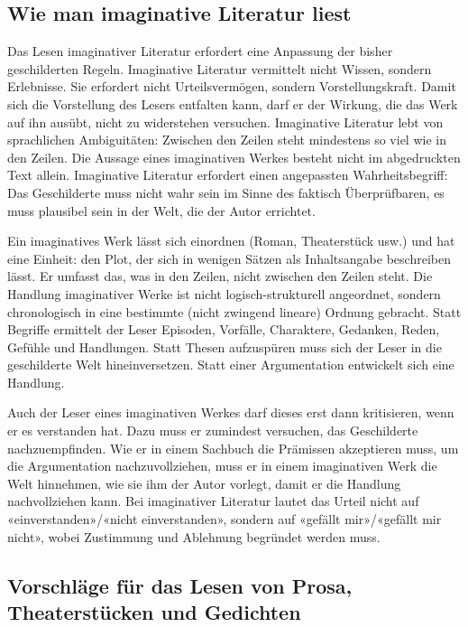 \documentclass[a4paper,11pt]{scrartcl}
\begin{document}
\subsection{Wie man imaginative Literatur liest}

Das Lesen imaginativer Literatur erfordert eine Anpassung der bisher geschilderten Regeln. Imaginative Literatur vermittelt nicht Wissen, sondern Erlebnisse. Sie erfordert nicht Urteilsvermögen, sondern Vorstellungskraft. Damit sich die Vorstellung des Lesers entfalten kann, darf er der Wirkung, die das Werk auf ihn ausübt, nicht zu widerstehen versuchen. Imaginative Literatur lebt von sprachlichen Ambiguitäten: Zwischen den Zeilen steht mindestens so viel wie in den Zeilen. Die Aussage eines imaginativen Werkes besteht nicht im abgedruckten Text allein. Imaginative Literatur erfordert einen angepassten Wahrheitsbegriff: Das Geschilderte muss nicht wahr sein im Sinne des faktisch Überprüfbaren, es muss plausibel sein in der Welt, die der Autor errichtet.

Ein imaginatives Werk lässt sich einordnen (Roman, Theaterstück usw.) und hat eine Einheit: den Plot, der sich in wenigen Sätzen als Inhaltsangabe beschreiben lässt. Er umfasst das, was in den Zeilen, nicht zwischen den Zeilen steht. Die Handlung imaginativer Werke ist nicht logisch-strukturell angeordnet, sondern chronologisch in eine bestimmte (nicht zwingend lineare) Ordnung gebracht. Statt Begriffe ermittelt der Leser Episoden, Vorfälle, Charaktere, Gedanken, Reden, Gefühle und Handlungen. Statt Thesen aufzuspüren muss sich der Leser in die geschilderte Welt hineinversetzen. Statt einer Argumentation entwickelt sich eine Handlung.

Auch der Leser eines imaginativen Werkes darf dieses erst dann kritisieren, wenn er es verstanden hat. Dazu muss er zumindest versuchen, das Geschilderte nachzuempfinden. Wie er in einem Sachbuch die Prämissen akzeptieren muss, um die Argumentation nachzuvollziehen, muss er in einem imaginativen Werk die Welt hinnehmen, wie sie ihm der Autor vorlegt, damit er die Handlung nachvollziehen kann. Bei imaginativer Literatur lautet das Urteil nicht auf «einverstanden»/«nicht einverstanden», sondern auf «gefällt mir»/«gefällt mir nicht», wobei Zustimmung und Ablehnung begründet werden muss.

\subsection{Vorschläge für das Lesen von Prosa, Theaterstücken und Gedichten}
\end{document}
